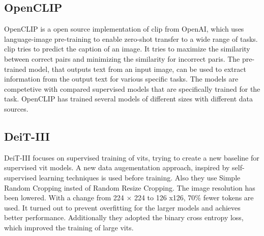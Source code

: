 \documentclass[conference]{IEEEtran}
\begin{document}
  \subsection{OpenCLIP}
  OpenCLIP is a open source implementation of \ac{clip} \cite{clip} from OpenAI, which uses language-image pre-training to enable zero-shot transfer to a wide range of tasks. \ac{clip} tries to predict the caption of an image. It tries to maximize the similarity between correct pairs and minimizing the similarity for incorrect paris. The pre-trained model, that outputs text from an input image, can be used to extract information from the output text for various specific tasks. The models are competetive with compared supervised models that are specifically trained for the task. \cite{clip}
  OpenCLIP has trained several models of different sizes with different data sources. \cite{open-clip} 

  \subsection{DeiT-III}
  DeiT-III focuses on supervised training of \acp{vit}, trying to create a new baseline for supervised \ac{vit} models. A new data augementation approach, inspired by self-supervised learning techniques is used before training. Also they use Simple Random Cropping insted of Random Resize Cropping. The image resolution has been lowered. With a change from 224 × 224 to 126 x126, 70\% fewer tokens are used. It turned out to prevent overfitting for the larger models and achieves better performance. Additionally they adopted the binary cross entropy loss, which improved the training of large \acp{vit}. \cite{deit3}
\end{document}
